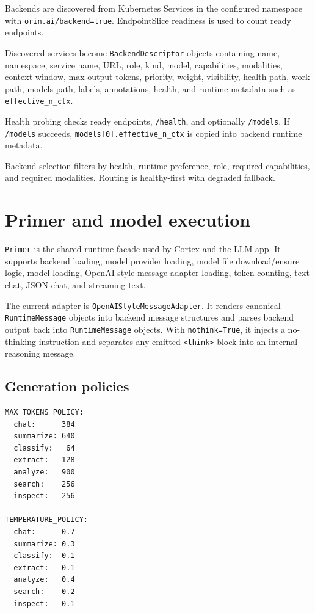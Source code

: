 \documentclass[11pt,a4paper]{article}
\begin{document}
Backends are discovered from Kubernetes Services in the configured namespace with \texttt{orin.ai/backend=true}. EndpointSlice readiness is used to count ready endpoints.

Discovered services become \texttt{BackendDescriptor} objects containing name, namespace, service name, URL, role, kind, model, capabilities, modalities, context window, max output tokens, priority, weight, visibility, health path, work path, models path, labels, annotations, health, and runtime metadata such as \texttt{effective\_n\_ctx}.

Health probing checks ready endpoints, \texttt{/health}, and optionally \texttt{/models}. If \texttt{/models} succeeds, \texttt{models[0].effective\_n\_ctx} is copied into backend runtime metadata.

Backend selection filters by health, runtime preference, role, required capabilities, and required modalities. Routing is healthy-first with degraded fallback.

\section{Primer and model execution}
\texttt{Primer} is the shared runtime facade used by Cortex and the LLM app. It supports backend loading, model provider loading, model file download/ensure logic, model loading, OpenAI-style message adapter loading, token counting, text chat, JSON chat, and streaming text.

The current adapter is \texttt{OpenAIStyleMessageAdapter}. It renders canonical \texttt{RuntimeMessage} objects into backend message structures and parses backend output back into \texttt{RuntimeMessage} objects. With \texttt{nothink=True}, it injects a no-thinking instruction and separates any emitted \texttt{<think>} block into an internal reasoning message.

\subsection{Generation policies}
\begin{lstlisting}
MAX_TOKENS_POLICY:
  chat:      384
  summarize: 640
  classify:   64
  extract:   128
  analyze:   900
  search:    256
  inspect:   256

TEMPERATURE_POLICY:
  chat:      0.7
  summarize: 0.3
  classify:  0.1
  extract:   0.1
  analyze:   0.4
  search:    0.2
  inspect:   0.1
\end{lstlisting}
\end{document}
